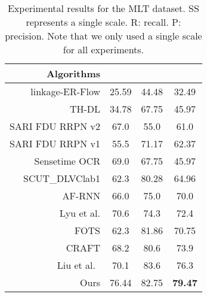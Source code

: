    \begin{table}[!t]
    \caption{Experimental results for the MLT dataset. SS represents a single scale. R: recall. P: precision. Note that we only used a single scale for all experiments. }
    \label{tab:mlt}
    \centering
    \newcommand{\tabincell}[2]{\begin{tabular}{@{}#1@{}}#2\end{tabular}}
    \small
\begin{tabular}{r |ccc}
      \hline
      Algorithms  &   &  &  \\
      \hline
      \hline
      linkage-ER-Flow  \cite{nayef2017icdar2017} & 25.59 & 44.48 & 32.49 \\
      \hline
      TH-DL  \cite{nayef2017icdar2017} & 34.78 & 67.75 & 45.97 \\
      \hline
      SARI FDU RRPN v2 \cite{ma2018arbitrary} & 67.0 & 55.0 & 61.0 \\
      \hline
      SARI FDU RRPN v1 \cite{ma2018arbitrary} & 55.5 & 71.17 & 62.37 \\
      \hline
      Sensetime OCR \cite{nayef2017icdar2017} & 69.0 & 67.75 & 45.97 \\
      \hline
      SCUT\_DLVClab1 \cite{liu2017deep} & 62.3 & 80.28 & 64.96 \\
      \hline
      AF-RNN  \cite{zhong2018anchor} & 66.0 & 75.0 & 70.0 \\
      \hline
      Lyu et al. \cite{lyu2018multi} & 70.6 & 74.3 & 72.4 \\
      \hline
      FOTS \cite{liu2018fots} & 62.3 & 81.86 & 70.75 \\
      \hline
      CRAFT \cite{baek2019character} & 68.2 & 80.6 & 73.9 \\
      \hline\hline
      Liu et al.\  \cite{liu2019omnidirectional}  & 70.1 & 83.6 & 76.3 \\
      \hline
      Ours & 76.44 & 82.75 & \textbf{79.47} \\
      \hline
    \end{tabular}
    \end{table}
  
